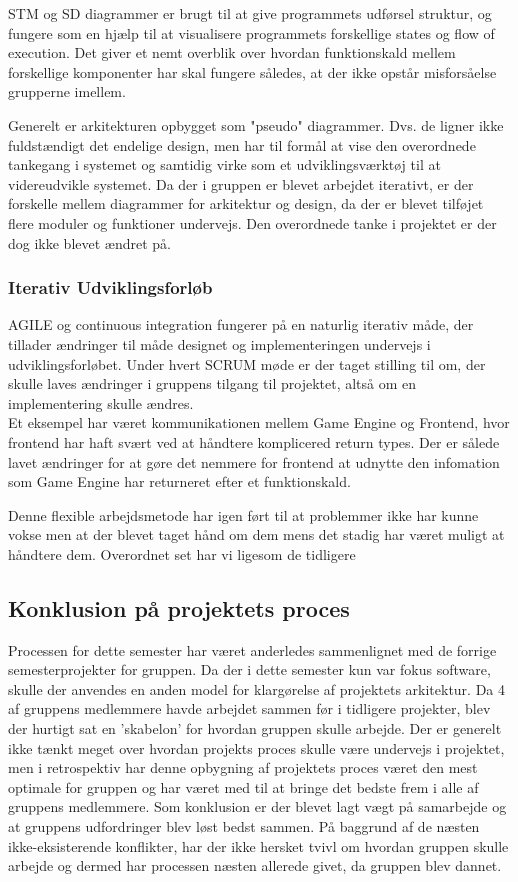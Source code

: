 STM og SD diagrammer er brugt til at give programmets udførsel struktur, og fungere
som en hjælp til at visualisere programmets forskellige states og flow of execution.
Det giver et nemt overblik over hvordan funktionskald mellem forskellige komponenter
har skal fungere således, at der ikke opstår misforsåelse grupperne imellem. 

Generelt er arkitekturen opbygget som "pseudo" diagrammer. Dvs. de ligner ikke fuldstændigt 
det endelige design, men har til formål at vise den overordnede tankegang i systemet og 
samtidig virke som et udviklingsværktøj til at videreudvikle systemet. Da der i gruppen 
er blevet arbejdet iterativt, er der forskelle mellem diagrammer for arkitektur og design,
da der er blevet tilføjet flere moduler og funktioner undervejs. Den overordnede tanke i 
projektet er der dog ikke blevet ændret på.

\subsubsection{Iterativ Udviklingsforløb}

AGILE og continuous integration fungerer på en naturlig iterativ måde, der tillader 
ændringer til måde designet og implementeringen undervejs i udviklingsforløbet.
Under hvert SCRUM møde er der taget stilling til om, der skulle laves ændringer i 
gruppens tilgang til projektet, altså om en implementering skulle ændres. \\

Et eksempel har været kommunikationen mellem Game Engine og Frontend, hvor frontend
har haft svært ved at håndtere komplicered return types. Der er sålede lavet
ændringer for at gøre det nemmere for frontend at udnytte den infomation som Game Engine
har returneret efter et funktionskald.

Denne flexible arbejdsmetode har igen ført til at problemmer ikke har kunne vokse men
at der blevet taget hånd om dem mens det stadig har været muligt at håndtere dem.
Overordnet set har vi ligesom de tidligere 

\subsection{Konklusion på projektets proces}
Processen for dette semester har været anderledes sammenlignet med de forrige semesterprojekter for gruppen. Da der i dette semester kun var fokus software, skulle der anvendes en anden model for klargørelse af projektets arkitektur. Da 4 af gruppens medlemmere havde arbejdet sammen før i tidligere projekter, blev der hurtigt sat en 'skabelon' for hvordan gruppen skulle arbejde. Der er generelt ikke tænkt meget over hvordan projekts proces skulle være undervejs i projektet, men i retrospektiv har denne opbygning af projektets proces været den mest optimale for gruppen og har været med til at bringe det bedste frem i alle af gruppens medlemmere. Som konklusion er der blevet lagt vægt på samarbejde og at gruppens udfordringer blev løst bedst sammen. På baggrund af de næsten ikke-eksisterende konflikter, har der ikke hersket tvivl om hvordan gruppen skulle arbejde og dermed har processen næsten allerede givet, da gruppen blev dannet.
